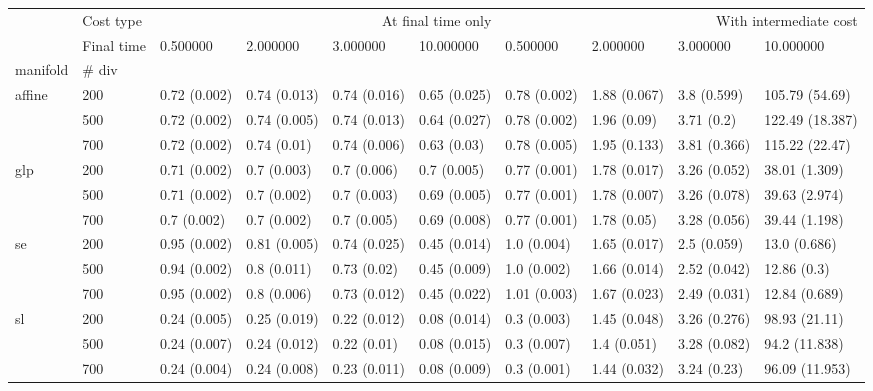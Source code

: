 \begin{tabular}{llllllllll}
\toprule
 & Cost type & \multicolumn{4}{r}{At final time only} & \multicolumn{4}{r}{With intermediate cost} \\
 & Final time & 0.500000 & 2.000000 & 3.000000 & 10.000000 & 0.500000 & 2.000000 & 3.000000 & 10.000000 \\
manifold & # div &  &  &  &  &  &  &  &  \\
\midrule
\multirow[t]{3}{*}{affine} & 200 & 0.72 (0.002) & 0.74 (0.013) & 0.74 (0.016) & 0.65 (0.025) & 0.78 (0.002) & 1.88 (0.067) & 3.8 (0.599) & 105.79 (54.69) \\
 & 500 & 0.72 (0.002) & 0.74 (0.005) & 0.74 (0.013) & 0.64 (0.027) & 0.78 (0.002) & 1.96 (0.09) & 3.71 (0.2) & 122.49 (18.387) \\
 & 700 & 0.72 (0.002) & 0.74 (0.01) & 0.74 (0.006) & 0.63 (0.03) & 0.78 (0.005) & 1.95 (0.133) & 3.81 (0.366) & 115.22 (22.47) \\
\cline{1-10}
\multirow[t]{3}{*}{glp} & 200 & 0.71 (0.002) & 0.7 (0.003) & 0.7 (0.006) & 0.7 (0.005) & 0.77 (0.001) & 1.78 (0.017) & 3.26 (0.052) & 38.01 (1.309) \\
 & 500 & 0.71 (0.002) & 0.7 (0.002) & 0.7 (0.003) & 0.69 (0.005) & 0.77 (0.001) & 1.78 (0.007) & 3.26 (0.078) & 39.63 (2.974) \\
 & 700 & 0.7 (0.002) & 0.7 (0.002) & 0.7 (0.005) & 0.69 (0.008) & 0.77 (0.001) & 1.78 (0.05) & 3.28 (0.056) & 39.44 (1.198) \\
\cline{1-10}
\multirow[t]{3}{*}{se} & 200 & 0.95 (0.002) & 0.81 (0.005) & 0.74 (0.025) & 0.45 (0.014) & 1.0 (0.004) & 1.65 (0.017) & 2.5 (0.059) & 13.0 (0.686) \\
 & 500 & 0.94 (0.002) & 0.8 (0.011) & 0.73 (0.02) & 0.45 (0.009) & 1.0 (0.002) & 1.66 (0.014) & 2.52 (0.042) & 12.86 (0.3) \\
 & 700 & 0.95 (0.002) & 0.8 (0.006) & 0.73 (0.012) & 0.45 (0.022) & 1.01 (0.003) & 1.67 (0.023) & 2.49 (0.031) & 12.84 (0.689) \\
\cline{1-10}
\multirow[t]{3}{*}{sl} & 200 & 0.24 (0.005) & 0.25 (0.019) & 0.22 (0.012) & 0.08 (0.014) & 0.3 (0.003) & 1.45 (0.048) & 3.26 (0.276) & 98.93 (21.11) \\
 & 500 & 0.24 (0.007) & 0.24 (0.012) & 0.22 (0.01) & 0.08 (0.015) & 0.3 (0.007) & 1.4 (0.051) & 3.28 (0.082) & 94.2 (11.838) \\
 & 700 & 0.24 (0.004) & 0.24 (0.008) & 0.23 (0.011) & 0.08 (0.009) & 0.3 (0.001) & 1.44 (0.032) & 3.24 (0.23) & 96.09 (11.953) \\

\end{tabular}
